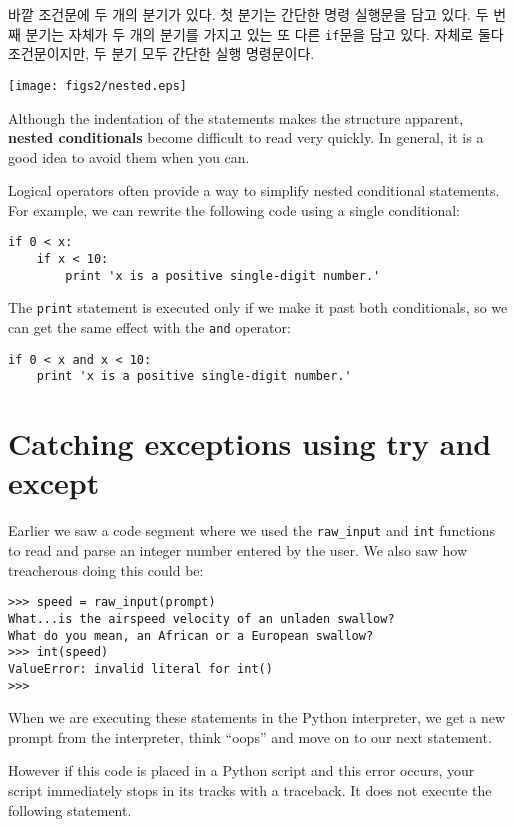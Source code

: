 바깥 조건문에 두 개의 분기가 있다. 첫 분기는 간단한 명령 실행문을 담고 있다. 두 번째 분기는 자체가 두 개의 분기를 가지고 있는 또 다른 {\tt if}문을 담고 있다.
자체로 둘다 조건문이지만, 두 분기 모두 간단한 실행 명령문이다.

\beforefig
\centerline{\texttt{[image: figs2/nested.eps]}}
\afterfig



Although the indentation of the statements makes the structure
apparent, {\bf nested conditionals} become difficult to read very
quickly. In general, it is a good idea to avoid them when you can.

Logical operators often provide a way to simplify nested conditional
statements.  For example, we can rewrite the following code using a
single conditional:

\beforeverb
\begin{verbatim}
if 0 < x:
    if x < 10:
        print 'x is a positive single-digit number.'
\end{verbatim}
\afterverb
%
The {\tt print} statement is executed only if we make it past both
conditionals, so we can get the same effect with the {\tt and} operator:

\beforeverb
\begin{verbatim}
if 0 < x and x < 10:
    print 'x is a positive single-digit number.'
\end{verbatim}
\afterverb


\section{Catching exceptions using try and except}
\label{catch1}

Earlier we saw a code segment where we used the \verb"raw_input" and
{\tt int} functions to read and parse an integer number entered by
the user.  We also saw how treacherous doing this could be:

\beforeverb
\begin{verbatim}
>>> speed = raw_input(prompt)
What...is the airspeed velocity of an unladen swallow?
What do you mean, an African or a European swallow?
>>> int(speed)
ValueError: invalid literal for int()
>>>
\end{verbatim}
\afterverb
%
When we are executing these statements in the Python interpreter, 
we get a new prompt from the interpreter, think ``oops'' and move 
on to our next statement.  

However if this code is placed in a 
Python script and this error occurs, your script immediately 
stops in its tracks with a traceback.  
It does not execute the following statement. 

